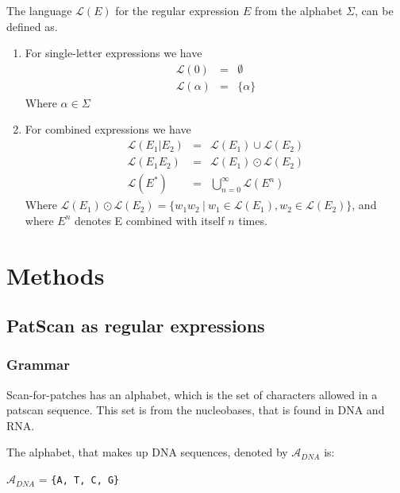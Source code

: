 \documentclass[12pt]{article}
\theoremstyle{definition}
\begin{document}
\begin{definition} The language $\mathcal{L}(E)$ for the regular expression $E$ from the alphabet $\Sigma$, can be defined as.

	\begin{enumerate}
		\item For single-letter expressions we have
			\begin{eqnarray}
				\mathcal{L}(0) &=& \emptyset \\
				\mathcal{L}(\alpha) &=& \{\alpha\}
			\end{eqnarray}
			Where $\alpha \in \Sigma$
			
		\item For combined expressions we have
			\begin{eqnarray}
				\mathcal{L}(E_1|E_2) &=& \mathcal{L}(E_1) \cup \mathcal{L}(E_2) \\
				\mathcal{L}(E_1E_2) &=& \mathcal{L}(E_1) \odot \mathcal{L}(E_2) \\
				\mathcal{L}(E^*) &=& \bigcup^{\infty}_{n = 0}\mathcal{L}(E^n)
			\end{eqnarray}
			Where $\mathcal{L}(E_1) \odot \mathcal{L}(E_2) = \{w_1w_2 \ |\  w_1 \in \mathcal{L}(E_1), w_2 \in \mathcal{L}(E_2)\}$, and where $E^n$ denotes E combined with itself $n$ times.
	\end{enumerate}
\end{definition}


\newpage

\section{Methods}
\subsection{PatScan as regular expressions}

\subsubsection{Grammar}
\label{Patscan grammar}
Scan-for-patches has an alphabet, which is the set of characters allowed in a patscan sequence. This set is from the nucleobases, that is found in DNA and RNA.
\begin{definition}
The alphabet, that makes up DNA sequences, denoted by $\mathcal{A}_{DNA}$ is:
\begin{center}
$\mathcal{A}_{DNA}$ = \texttt{\{A, T, C, G\}}
\end{center}
\end{definition}
\end{document}
